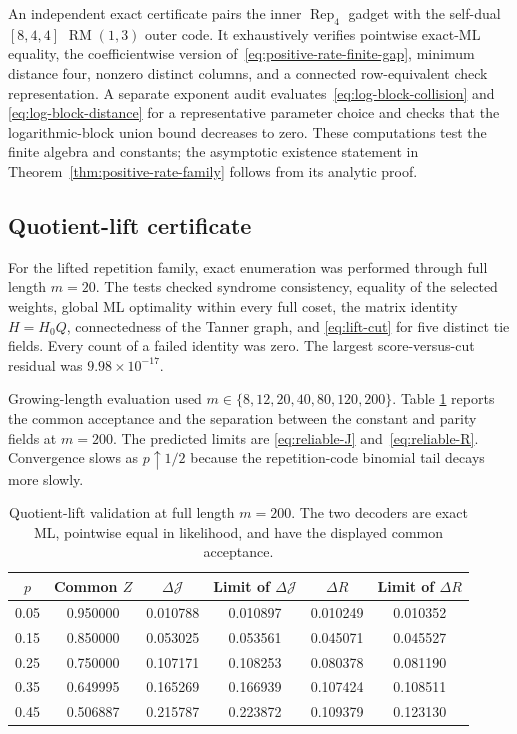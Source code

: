 \documentclass[journal]{IEEEtran}
\theoremstyle{definition}
\theoremstyle{remark}
\begin{document}
An independent exact certificate pairs the inner $\operatorname{Rep}_4$
gadget with the self-dual $[8,4,4]$ $\operatorname{RM}(1,3)$ outer code.  It
exhaustively verifies pointwise exact-ML equality, the coefficientwise version
of~\eqref{eq:positive-rate-finite-gap}, minimum distance four, nonzero distinct
columns, and a connected row-equivalent check representation.  A separate
exponent audit evaluates~\eqref{eq:log-block-collision} and
\eqref{eq:log-block-distance} for a representative parameter choice and checks
that the logarithmic-block union bound decreases to zero.  These computations
test the finite algebra and constants; the asymptotic existence statement in
Theorem~\ref{thm:positive-rate-family} follows from its analytic proof.

\subsection{Quotient-lift certificate}

For the lifted repetition family, exact enumeration was performed through
full length $m=20$.  The tests checked syndrome consistency, equality of the
selected weights, global ML optimality within every full coset, the matrix
identity $H=H_0Q$, connectedness of the Tanner graph, and
\eqref{eq:lift-cut} for five distinct tie fields.  Every count of a failed
identity was zero.  The largest score-versus-cut residual was
$9.98\times10^{-17}$.

Growing-length evaluation used $m\in\{8,12,20,40,80,120,200\}$.  Table
\ref{tab:lift-scaling} reports the common acceptance and the separation between
the constant and parity fields at $m=200$.  The predicted limits are
\eqref{eq:reliable-J} and~\eqref{eq:reliable-R}.  Convergence slows as
$p\uparrow1/2$ because the repetition-code binomial tail decays more slowly.

\begin{table}[t]
\centering
\caption{Quotient-lift validation at full length $m=200$.  The two decoders
are exact ML, pointwise equal in likelihood, and have the displayed common
acceptance.}
\label{tab:lift-scaling}
\begin{tabular}{@{}cccccc@{}}
\toprule
$p$ & Common $Z$ & $\Delta\mathcal J$ & Limit of $\Delta\mathcal J$
& $\Delta R$ & Limit of $\Delta R$\\
\midrule
0.05 & 0.950000 & 0.010788 & 0.010897 & 0.010249 & 0.010352\\
0.15 & 0.850000 & 0.053025 & 0.053561 & 0.045071 & 0.045527\\
0.25 & 0.750000 & 0.107171 & 0.108253 & 0.080378 & 0.081190\\
0.35 & 0.649995 & 0.165269 & 0.166939 & 0.107424 & 0.108511\\
0.45 & 0.506887 & 0.215787 & 0.223872 & 0.109379 & 0.123130\\
\bottomrule
\end{tabular}
\end{table}
\end{document}
